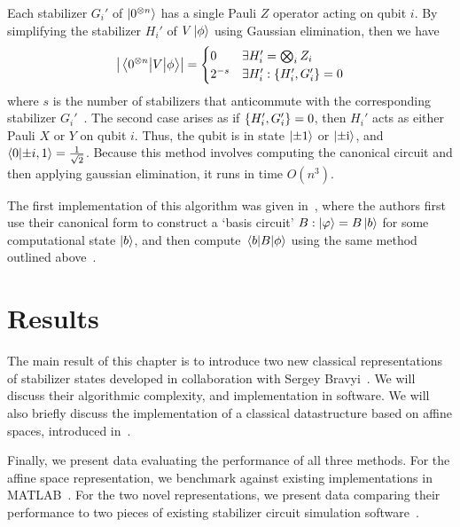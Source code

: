 Each stabilizer $G_{i}'$ of $\ket{0^{\otimes n}}$ has a single Pauli $Z$ operator acting on qubit $i$. By simplifying the stabilizer $H_{i}'$ of $V\ket{\phi}$ using Gaussian elimination, then we have
\begin{equation}
\left\vert \matrixel{0^{\otimes n}}{V}{\phi}\right\vert = \begin{cases}
 0 & \exists H_{i}' = \bigotimes_{i}Z_{i}\\
 2^{-s} & \exists H_{i}' : \acomm{H_{i}'}{G_{i}'} = 0
\end{cases}
\end{equation}
where $s$ is the number of stabilizers that anticommute with the corresponding stabilizer $G_{i}'$~\cite{Aaronson2004}. The second case arises as if $\acomm{H_{i}'}{G_{i}'} = 0$, then $H_{i}'$ acts as either Pauli $X$ or $Y$ on qubit $i$. Thus, the qubit is in state $\ket{\pm 1}$ or $\ket{\pm\mathrm{i}}$, and $\braket{0}{\pm i,1}=\frac{1}{\sqrt{2}}$. Because this method involves computing the canonical circuit and then applying gaussian elimination, it runs in time $O(n^{3})$.\par
The first implementation of this algorithm was given in~\cite{Garcia2012}, where the authors first use their canonical form to construct a `basis circuit' $B : \ket{\varphi}=B\ket{b}$ for some computational state $\ket{b}$, and then compute $\matrixel{b}{B}{\phi}$ using the same method outlined above~\cite{Garcia2012}.
\section{Results}
The main result of this chapter is to introduce two new classical representations of stabilizer states developed in collaboration with Sergey Bravyi~\cite{Bravyi2018}. We will discuss their algorithmic complexity, and implementation in software. We will also briefly discuss the implementation of a classical datastructure based on affine spaces, introduced in~\cite{Bravyi2016}.\par
Finally, we  present data evaluating the performance of all three methods. For the affine space representation, we benchmark against existing implementations in MATLAB~\cite{Bravyi2016}. For the two novel representations, we present data comparing their performance to two pieces of existing stabilizer circuit simulation software~\cite{Aaronson2004,Anders2006}.
